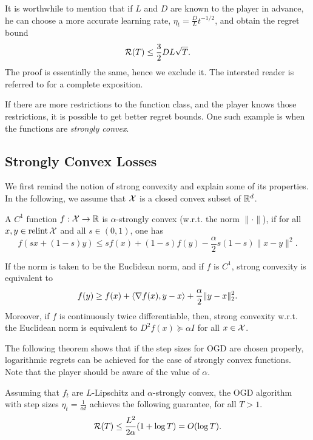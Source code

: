 \begin{remark}
    It is worthwhile to mention that if $L$ and $D$ are known to the player in advance, he can choose a more accurate learning rate, $\eta_t = \frac{D}{L}t^{-1/2}$, and obtain the regret bound
\[
    \mathcal{R}(T) \leq \frac{3}{2}DL\sqrt{T}.
\]
The proof is essentially the same, hence we exclude it. The intersted reader is referred to \citet{hazan2016introduction} for a complete exposition.
\end{remark}

If there are more restrictions to the function class, and the player knows those restrictions, it is possible to get better regret bounds. One such example is when the functions are \emph{strongly convex}.

\subsection{Strongly Convex Losses}
We first remind the notion of strong convexity and explain some of its properties. In the following, we assume that $\mathcal{X}$ is a closed convex subset of $\mathbb{R}^d$.

\begin{definition}
    A $C^1$ function $f:\mathcal{X}\to\mathbb{R}$ is $\alpha$-strongly convex (w.r.t. the norm $\|\cdot\|$), if for all $x,y\in\mathop{\mathrm{relint}}\mathcal{X}$ and all $s \in (0,1)$, one has
    \[
        f(sx + (1-s)y) \leq sf(x) + (1-s)f(y) - \frac{\alpha}{2}s(1-s)\|x-y\|^2.
    \]
\end{definition}

\begin{remark}
    If the norm is taken to be the Euclidean norm, and if $f$ is $C^1$, strong convexity is equivalent to 
    \[
        f(y) \geq f(x) + \left\langle \nabla f(x),y-x \right\rangle + \frac{\alpha}{2}\|y-x\|_2^2.
    \]
    Moreover, if $f$ is continuously twice differentiable, then, strong convexity w.r.t. the Euclidean norm is equivalent to $D^2 f(x) \succeq \alpha I$ for all $x\in\mathcal{X}$.
\end{remark}

The following theorem shows that if the step sizes for OGD are chosen properly, logarithmic regrets can be achieved for the case of strongly convex functions. Note that the player should be aware of the value of $\alpha$.

\begin{theorem}\label{thm:ogdsc}
    Assuming that $f_t$ are $L$-Lipschitz and $\alpha$-strongly convex, the OGD algorithm with step sizes $\eta_t = \frac{1}{\alpha t}$ achieves the following guarantee, for all $T > 1$.
    \[
        \mathcal{R}(T) \leq \frac{L^2}{2\alpha} (1+\log T) = O(\log T).
    \]
\end{theorem}

